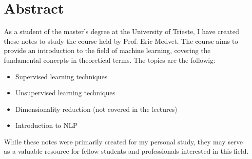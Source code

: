 \section*{Abstract}

As a student of the  master's degree at the University of Trieste, I have created these notes to study the course  held by Prof. Eric Medvet. The course aims to provide an introduction to the field of machine learning, covering the fundamental concepts in theoretical terms.
The topics are the followig:
\begin{itemize}
    \item Supervised learning techniques
    \item Unsupervised learning techniques
    \item Dimensionality reduction (not covered in the lectures)
    \item Introduction to NLP
\end{itemize}
While these notes were primarily created for my personal study, they may serve as a valuable resource for fellow students and professionals interested in this field.

